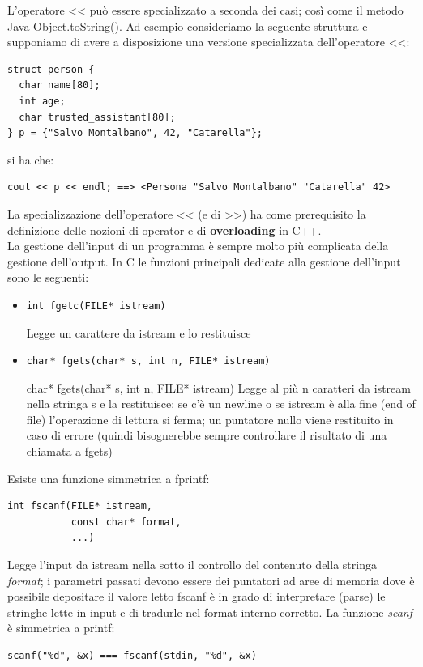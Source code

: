 \documentclass[a4paper,12pt, oneside]{book}
\begin{document}
L'operatore << può essere specializzato a seconda dei casi;
così come il metodo Java Object.toString(). Ad esempio consideriamo la seguente struttura e supponiamo
di avere a disposizione una versione specializzata
dell'operatore <<:
\begin{verbatim}
struct person {
  char name[80];
  int age;
  char trusted_assistant[80];
} p = {"Salvo Montalbano", 42, "Catarella"};
\end{verbatim}
si ha che:
\begin{verbatim}
cout << p << endl; ==> <Persona "Salvo Montalbano" "Catarella" 42>
\end{verbatim}
La specializzazione dell'operatore << (e di >>) ha come
prerequisito la definizione delle nozioni di operator e di
\textbf{overloading }in C++.\\
La gestione dell'input di un programma è sempre molto più
complicata della gestione dell'output. In C le funzioni principali dedicate alla gestione dell'input sono
le seguenti:
\begin{itemize}
\item
\begin{verbatim}
int fgetc(FILE* istream)
\end{verbatim}
Legge un carattere da istream e lo restituisce
\item 
\begin{verbatim}
char* fgets(char* s, int n, FILE* istream)
\end{verbatim}
char* fgets(char* s, int n, FILE* istream)
Legge al più n caratteri da istream nella stringa s e la restituisce;
se c'è un newline o se istream è alla fine (end of file) l'operazione di lettura si ferma; un puntatore nullo viene restituito in caso di errore (quindi bisognerebbe sempre controllare il risultato di una chiamata a
fgets)
\end{itemize}
Esiste una funzione simmetrica a fprintf:
\begin{verbatim}
int fscanf(FILE* istream,
           const char* format,
           ...)
\end{verbatim}
Legge l'input da istream nella sotto il controllo del contenuto della stringa \textit{format}; i parametri passati devono essere dei puntatori ad
aree di memoria dove è possibile depositare il valore letto
fscanf è in grado di interpretare (parse) le stringhe lette in input e di tradurle nel format interno corretto. La funzione \textit{scanf} è simmetrica a printf:
\begin{verbatim}
scanf("%d", &x) === fscanf(stdin, "%d", &x)
\end{verbatim}
\end{document}
